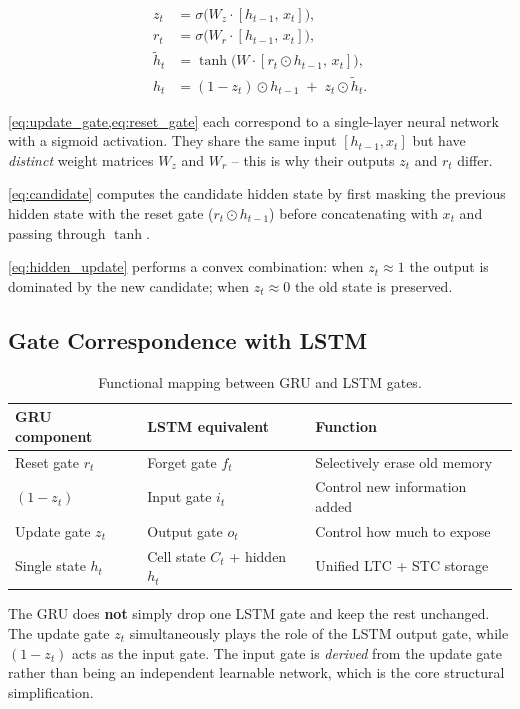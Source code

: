 \documentclass[12pt,a4paper]{article}
\begin{document}
\begin{align}
  z_t &= \sigma\!\bigl(W_z\cdot[h_{t-1},\,x_t]\bigr),
  \label{eq:update_gate} \\[4pt]
  r_t &= \sigma\!\bigl(W_r\cdot[h_{t-1},\,x_t]\bigr),
  \label{eq:reset_gate} \\[4pt]
  \tilde{h}_t &= \tanh\!\bigl(W\cdot[r_t \odot h_{t-1},\,x_t]\bigr),
  \label{eq:candidate} \\[4pt]
  h_t &= (1 - z_t)\odot h_{t-1} \;+\; z_t\odot\tilde{h}_t.
  \label{eq:hidden_update}
\end{align}

\cref{eq:update_gate,eq:reset_gate} each correspond to a single-layer neural network with a sigmoid
activation. They share the same input $[h_{t-1}, x_t]$ but have \emph{distinct} weight matrices
$W_z$ and $W_r$ -- this is why their outputs $z_t$ and $r_t$ differ.

\cref{eq:candidate} computes the candidate hidden state by first masking the previous hidden state
with the reset gate ($r_t \odot h_{t-1}$) before concatenating with $x_t$ and passing through
$\tanh$.

\cref{eq:hidden_update} performs a convex combination: when $z_t \approx 1$ the output is
dominated by the new candidate; when $z_t \approx 0$ the old state is preserved.

\subsection{Gate Correspondence with LSTM}

\begin{table}[htbp]
\centering
\caption{Functional mapping between GRU and LSTM gates.}
\label{tab:gate_map}
\begin{tabular}{@{}lll@{}}
\toprule
\textbf{GRU component} & \textbf{LSTM equivalent} & \textbf{Function} \\
\midrule
Reset gate $r_t$ & Forget gate $f_t$ & Selectively erase old memory \\
$(1 - z_t)$ & Input gate $i_t$ & Control new information added \\
Update gate $z_t$ & Output gate $o_t$ & Control how much to expose \\
Single state $h_t$ & Cell state $C_t$ + hidden $h_t$ & Unified LTC + STC storage \\
\bottomrule
\end{tabular}
\end{table}

\begin{warningbox}[title=Common Misconception]
The GRU does \textbf{not} simply drop one LSTM gate and keep the rest unchanged.  The update gate
$z_t$ simultaneously plays the role of the LSTM output gate, while $(1-z_t)$ acts as the input gate.
The input gate is \emph{derived} from the update gate rather than being an independent learnable
network, which is the core structural simplification.
\end{warningbox}
\end{document}
